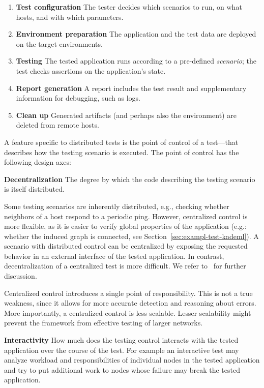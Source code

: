 \begin{enumerate}
\item \textbf{Test configuration} The tester decides which scenarios to run, on what
  hosts, and with which parameters.
\item \textbf{Environment preparation} The application and the test data are deployed on the target environments.
\item \textbf{Testing} The tested application runs according to a pre-defined \emph{scenario}; the test checks assertions on the application's state.
\item \textbf{Report generation} A report includes the test
  result and supplementary information for debugging, such as logs.
\item \textbf{Clean up} Generated artifacts (and perhaps also the environment) are deleted from remote hosts.
\end{enumerate}

A feature specific to distributed tests is the point of control of a test---that
describes how the testing scenario is executed. The point of control has the
following design axes:

\begin{description}
  \item{\textbf{Decentralization}} The degree by which the code describing the testing scenario is itself distributed.

    Some testing scenarios are inherently distributed, e.g., checking whether
    neighbors of a host respond to a periodic ping.  However, centralized
    control is more flexible, as it is easier to verify global properties of the
    application (e.g.: whether the induced graph is connected, see
    Section~\ref{sec:exampl-test-kademl}).  A scenario with distributed control
    can be centralized by exposing the requested behavior in an external
    interface of the tested application. In contrast, decentralization of a centralized
    test is more difficult.
    We refer to~\cite{ulr99,hie08,hie12} for further discussion.

    Centralized control introduces a single point of responsibility.
    This is not a true weakness, since it allows for more accurate detection and reasoning about errors.
    More importantly, a centralized control is less scalable.
    Lesser scalability might prevent the framework from effective testing of larger networks.

  \item{\textbf{Interactivity}} How much does the testing control interacts with
    the tested application over the course of the test.
    For example an interactive test may analyze workload and responsibilities of
    individual nodes in the tested application and try to put additional work to
    nodes whose failure may break the tested application.
\end{description}


